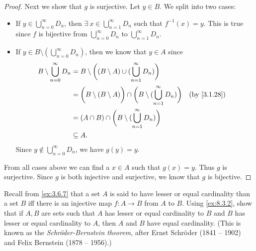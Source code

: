 \begin{proof}
  Next we show that \(g\) is surjective.
  Let \(y \in B\).
  We split into two cases:
  \begin{itemize}
    \item If \(y \in \bigcup_{n = 0}^\infty D_n\), then \(\exists\ x \in \bigcup_{n = 1}^\infty D_n\) such that \(f^{-1}(x) = y\).
          This is true since \(f\) is bijective from \(\bigcup_{n = 0}^\infty D_n\) to \(\bigcup_{n = 1}^\infty D_n\).
    \item If \(y \in B \setminus (\bigcup_{n = 0}^\infty D_n)\), then we know that \(y \in A\) since
          \begin{align*}
            B \setminus \bigcup_{n = 0}^\infty D_n & = B \setminus \bigg((B \setminus A) \cup (\bigcup_{n = 1}^\infty D_n)\bigg)                                                        \\
                                                   & = \bigg(B \setminus (B \setminus A)\bigg) \cap \bigg(B \setminus (\bigcup_{n = 1}^\infty D_n)\bigg) &  & \text{(by \cref{3.1.28})} \\
                                                   & = (A \cap B) \cap \bigg(B \setminus (\bigcup_{n = 1}^\infty D_n)\bigg)                                                             \\
                                                   & \subseteq A.
          \end{align*}
          Since \(y \notin \bigcup_{n = 0}^\infty D_n\), we have \(g(y) = y\).
  \end{itemize}
  From all cases above we can find a \(x \in A\) such that \(g(x) = y\).
  Thus \(g\) is surjective.
  Since \(g\) is both injective and surjective, we know that \(g\) is bijective.
\end{proof}

\begin{ex}\label{ex:8.3.3}
  Recall from \cref{ex:3.6.7} that a set \(A\) is said to have lesser or equal cardinality than a set \(B\) iff there is an injective map \(f : A \to B\) from \(A\) to \(B\).
  Using \cref{ex:8.3.2}, show that if \(A, B\) are sets such that \(A\) has lesser or equal cardinality to \(B\) and \(B\) has lesser or equal cardinality to \(A\), then \(A\) and \(B\) have equal cardinality.
  (This is known as the \emph{Schröder-Bernstein theorem}, after Ernst Schröder (1841 -- 1902) and Felix Bernstein (1878 -- 1956).)
\end{ex}

